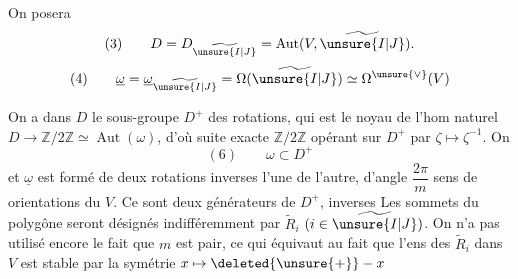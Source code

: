 On posera
\[
(3)\qquad D=D_{\widetilde{\unsure{I|J}}}=\operatorname{Aut}(V,\widetilde{\unsure{I|J}}).
\]
\[
(4)\qquad\underline\omega=\underline\omega_{\widetilde{\unsure{I|J}}}
=\Omega(\widetilde{\unsure{I|J}})\simeq\Omega^{\unsure{\vee}}(V)
\]

On a dans $D$ le sous-groupe $D^+$ des rotations, qui est le noyau
de l'hom naturel 
$D\longrightarrow\mathbb Z/2\mathbb Z\simeq\operatorname{Aut}(\omega)$,
d'où suite exacte
$\mathbb Z/2\mathbb Z$ opérant sur $D^+$ par $\zeta\mapsto\zeta^{-1}$.
On  
\[
(6)\qquad\omega\subset D^+
\]
et $\underline\omega$ est formé de deux rotations inverses l'une de l'autre,
d'angle $\dfrac{2\pi}{m}$   sens de
  orientations du $V$.
Ce sont deux générateurs de $D^+$, inverses
Les  sommets du polygône seront désignés indifféremment par
$\widetilde R_i$ $(i\in\widetilde{\unsure{I|J}})$.
On n'a pas utilisé encore le fait que $m$ est pair, ce qui équivaut au fait que
l'ens des $\widetilde R_i$ dans $V$ est stable par la symétrie
$x\mapsto\deleted{\unsure{+}}-x$
